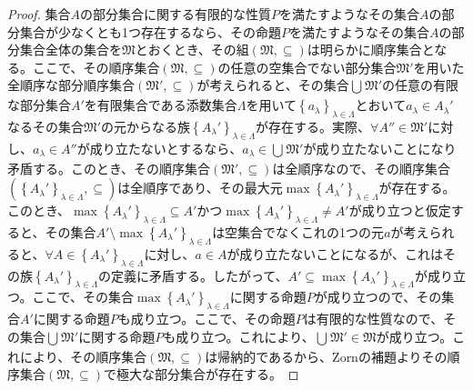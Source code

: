 \documentclass[dvipdfmx]{jsarticle}
\begin{document}
\begin{proof}
集合$A$の部分集合に関する有限的な性質$P$を満たすようなその集合$A$の部分集合が少なくとも1つ存在するなら、その命題$P$を満たすようなその集合$A$の部分集合全体の集合を$\mathfrak{M}$とおくとき、その組$\left( \mathfrak{M, \subseteq} \right)$は明らかに順序集合となる。ここで、その順序集合$\left( \mathfrak{M, \subseteq} \right)$の任意の空集合でない部分集合$\mathfrak{M}'$を用いた全順序な部分順序集合$\left( \mathfrak{M}', \subseteq \right)$が考えられると、その集合$\bigcup_{} \mathfrak{M}'$の任意の有限な部分集合$A'$を有限集合である添数集合$\varLambda $を用いて$\left\{ a_{\lambda} \right\}_{\lambda \in \varLambda } $とおいて$a_{\lambda} \in A_{\lambda}'$なるその集合$\mathfrak{M}'$の元からなる族$\left\{ A_{\lambda}' \right\}_{\lambda \in \varLambda }$が存在する。実際、$\forall A'' \in \mathfrak{M}'$に対し、$a_{\lambda} \in A''$が成り立たないとするなら、$a_{\lambda} \in \bigcup_{} \mathfrak{M}'$が成り立たないことになり矛盾する。このとき、その順序集合$\left( \mathfrak{M}', \subseteq \right)$は全順序なので、その順序集合$\left( \left\{ A_{\lambda}' \right\}_{\lambda \in \varLambda }, \subseteq \right)$は全順序であり、その最大元$\max\left\{ A_{\lambda}' \right\}_{\lambda \in \varLambda }$が存在する。このとき、$\max\left\{ A_{\lambda}' \right\}_{\lambda \in \varLambda } \subseteq A'$かつ$\max\left\{ A_{\lambda}' \right\}_{\lambda \in \varLambda } \neq A'$が成り立つと仮定すると、その集合$A' \setminus \max\left\{ A_{\lambda}' \right\}_{\lambda \in \varLambda }$は空集合でなくこれの1つの元$a$が考えられると、$\forall A \in \left\{ A_{\lambda}' \right\}_{\lambda \in \varLambda }$に対し、$a \in A$が成り立たないことになるが、これはその族$\left\{ A_{\lambda}' \right\}_{\lambda \in \varLambda }$の定義に矛盾する。したがって、$A' \subseteq \max\left\{ A_{\lambda}' \right\}_{\lambda \in \varLambda }$が成り立つ。ここで、その集合$\max\left\{ A_{\lambda}' \right\}_{\lambda \in \varLambda }$に関する命題$P$が成り立つので、その集合$A'$に関する命題$P$も成り立つ。ここで、その命題$P$は有限的な性質なので、その集合$\bigcup_{} \mathfrak{M}'$に関する命題$P$も成り立つ。これにより、$\bigcup_{} \mathfrak{M}'\in \mathfrak{M}$が成り立つ。これにより、その順序集合$\left( \mathfrak{M, \subseteq} \right)$は帰納的であるから、Zornの補題よりその順序集合$\left( \mathfrak{M, \subseteq} \right)$で極大な部分集合が存在する。\par

\end{proof}
\end{document}

